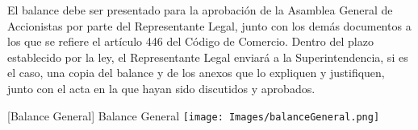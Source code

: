 El balance debe ser presentado para la aprobación de la Asamblea General de Accionistas por parte del Representante Legal, junto con los demás documentos a los que se refiere el artículo 446 del Código de Comercio. Dentro del plazo establecido por la ley, el Representante Legal enviará a la Superintendencia, si es el caso, una copia del balance y de los anexos que lo expliquen y justifiquen, junto con el acta en la que hayan sido discutidos y aprobados.

\vspace{2mm}
\begin{minipage}{0.8\textwidth}
\centering
{}[{Balance General}]{ Balance General }
\label{balanceGeneral}
\texttt{[image: Images/balanceGeneral.png]}
\end{minipage}
\newpage